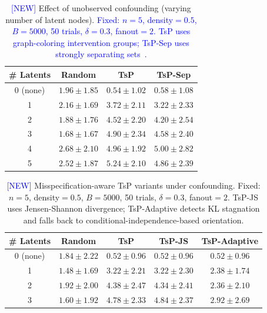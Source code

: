 \documentclass{article}
\newcommand{\added}[1]{\textcolor{blue}{#1}}
\begin{document}
\begin{table}[h]
\centering
\caption{\added{[NEW]} Effect of unobserved confounding (varying number of latent nodes). \added{Fixed: $n=5$, density$=0.5$, $B=5000$, 50 trials, $\delta=0.3$, fanout$=2$. TsP uses graph-coloring intervention groups; TsP-Sep uses strongly separating sets~\cite{kocaoglu2017experimental}.}}
\label{tab:confounding}
\begin{tabular}{c|ccc}
\toprule
\# Latents & Random & TsP & TsP-Sep \\
\midrule
0 (none) & $1.96 \pm 1.85$ & $0.54 \pm 1.02$ & $0.58 \pm 1.08$ \\
1 & $2.16 \pm 1.69$ & $3.72 \pm 2.11$ & $3.22 \pm 2.33$ \\
2 & $1.88 \pm 1.76$ & $4.52 \pm 2.20$ & $4.20 \pm 2.54$ \\
3 & $1.68 \pm 1.67$ & $4.90 \pm 2.34$ & $4.58 \pm 2.40$ \\
4 & $2.68 \pm 2.10$ & $4.96 \pm 1.92$ & $5.00 \pm 2.82$ \\
5 & $2.52 \pm 1.87$ & $5.24 \pm 2.10$ & $4.86 \pm 2.39$ \\
\bottomrule
\end{tabular}
\end{table}

\begin{table}[h]
\centering
\caption{\added{[NEW]} Misspecification-aware TsP variants under confounding. Fixed: $n=5$, density$=0.5$, $B=5000$, 50 trials, $\delta=0.3$, fanout$=2$.
TsP-JS uses Jensen-Shannon divergence; TsP-Adaptive detects KL stagnation and falls back to conditional-independence-based orientation.}
\label{tab:improvements}
\begin{tabular}{c|cccc}
\toprule
\# Latents & Random & TsP & TsP-JS & TsP-Adaptive \\
\midrule
0 (none) & $1.84 \pm 2.22$ & $0.52 \pm 0.96$ & $0.52 \pm 0.96$ & $0.52 \pm 0.96$ \\
1 & $1.48 \pm 1.69$ & $3.22 \pm 2.21$ & $3.22 \pm 2.30$ & $\mathbf{2.38 \pm 1.74}$ \\
2 & $1.92 \pm 2.00$ & $4.38 \pm 2.47$ & $4.34 \pm 2.41$ & $\mathbf{2.36 \pm 2.10}$ \\
3 & $1.60 \pm 1.92$ & $4.78 \pm 2.33$ & $4.84 \pm 2.37$ & $\mathbf{2.92 \pm 2.69}$ \\
\bottomrule
\end{tabular}
\end{table}
\end{document}
